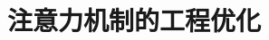 \setcounter{chapter}{18}

\hypertarget{ux6ce8ux610fux529bux673aux5236ux7684ux5de5ux7a0bux4f18ux5316}{%
\chapter{注意力机制的工程优化}\label{ux6ce8ux610fux529bux673aux5236ux7684ux5de5ux7a0bux4f18ux5316}}

